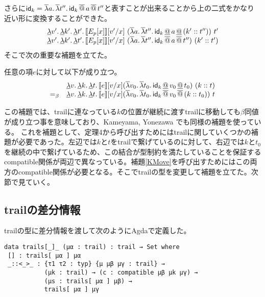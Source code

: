 さらに$\Idk = \SLam{a}{\SLam{t''}{\Idk \SAppS a \SAppS t''}}$と表すことが出来ることから上の二式をかなり近い形に変換することができた。
\[
\begin{array}{l}
  \DLam{v'}{\DLam{k'}{\DLam{t'}{\CPSTh{E_p[x]}[\Change{x}{v'}]\
        \SLamP{a}{\SLam{t''}{\Idk \DAppS a \DAppS \ConsP{k'}{t''}}}\ t'}}}\\
  \DLamS v'.\,\DLamS k'.\,\DLamS t'.\,

     \CPSTh{E_p[x]}[\Change{x}{v'}]\
     \SLamP{a}{\SLam{t''}{\Idk \SAppS a \SAppS t''}}\ \ConsP{k'}{t'}\\
     
\end{array}
\]
そこで次の重要な補題を立てた。

\begin{lemma}[$k$の移動]\upshape
  任意の項$e$に対して以下が成り立つ。
\[
\begin{array}{cl}
& \DLam{v}{\DLam{k}{\DLam{t}{\CPSTh{e}[\Change{x}{v}] \SLamP{v_0}{\SLam{t_0}{\DApp{\Idk}{\DApp{v_0}{t_0}}}}\ \ConsP{k}{t}}}} \\
  =_{\beta} &
  \DLam{v}{\DLam{k}{\DLam{t}{\CPSTh{e}[\Change{x}{v}] \SLamP{v_0}{\SLam{t_0}{\SApp{\Idk}{\SApp{v_0}{\ConsP{k}{t_0}}}}}\ t}}}
\end{array}
\]
\label{KMove}
\end{lemma}
この補題では、trailに連なっている$k$の位置が継続に渡すtrailに移動しても$\beta$同値が成り立つ事を意味しており、Kameyama, Yonezawa \cite{KY2008}でも同様の補題を使っている。
これを補題として、定理4から呼び出すためにはtrailに関していくつかの補題が必要であった。左辺では$k$と$t$をtrailで繋げているのに対して、右辺では$k$と$t_0$を継続の中で繋げているため、この結合が型制約を満たしていることを保証する\textsf{compatible}関係が両辺で異なっている。補題\ref{KMove}を呼び出すためにはこの両方の\textsf{compatible}関係が必要となる。そこでtrailの型を変更して補題を立てた。次節で見ていく。

\subsection{trailの差分情報}
trailの型に差分情報を渡して次のようにAgdaで定義した。


\begin{verbatim}
data trails[_]_ (μα : trail) : trail → Set where
 [] : trails[ μα ] μα
 _::<_>_ : {τ1 τ2 : typ} {μ μβ μγ : trail} →
           (μk : trail) → (c : compatible μβ μk μγ) →
           (μs : trails[ μα ] μβ) →
           trails[ μα ] μγ
\end{verbatim}

